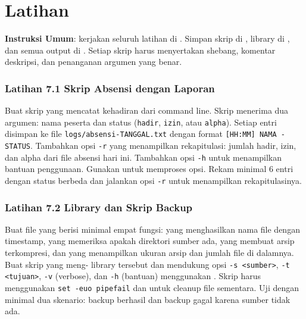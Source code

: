 \section{Latihan}
\label{sec:latihan-bash-prog}

\textbf{Instruksi Umum}: kerjakan seluruh latihan di
. Simpan skrip di , library
di , dan semua output di . Setiap skrip harus
menyertakan shebang, komentar deskripsi, dan penanganan argumen yang
benar.

\subsubsection*{Latihan 7.1 Skrip Absensi dengan Laporan}
Buat skrip  yang mencatat kehadiran dari command line.
Skrip menerima dua argumen: nama peserta dan status (\texttt{hadir},
\texttt{izin}, atau \texttt{alpha}). Setiap entri disimpan ke file
\texttt{logs/absensi-TANGGAL.txt} dengan format
\texttt{[HH:MM] NAMA - STATUS}. Tambahkan opsi \texttt{-r} yang
menampilkan rekapitulasi: jumlah hadir, izin, dan alpha dari file absensi
hari ini. Tambahkan opsi \texttt{-h} untuk menampilkan bantuan penggunaan.
Gunakan  untuk memproses opsi. Rekam minimal 6 entri dengan
status berbeda dan jalankan opsi \texttt{-r} untuk menampilkan
rekapitulasinya.


\subsubsection*{Latihan 7.2 Library dan Skrip Backup}
Buat file  yang berisi minimal empat fungsi:
 yang menghasilkan nama file dengan timestamp,
 yang memeriksa apakah direktori sumber ada,
 yang membuat arsip terkompresi, dan
 yang menampilkan ukuran arsip dan jumlah file
di dalamnya. Buat skrip  yang meng-
library tersebut dan mendukung opsi \texttt{-s <sumber>}, \texttt{-t
<tujuan>}, \texttt{-v} (verbose), dan \texttt{-h} (bantuan) menggunakan
. Skrip harus menggunakan \texttt{set -euo pipefail} dan
 untuk cleanup file sementara. Uji dengan minimal dua skenario:
backup berhasil dan backup gagal karena sumber tidak ada.


